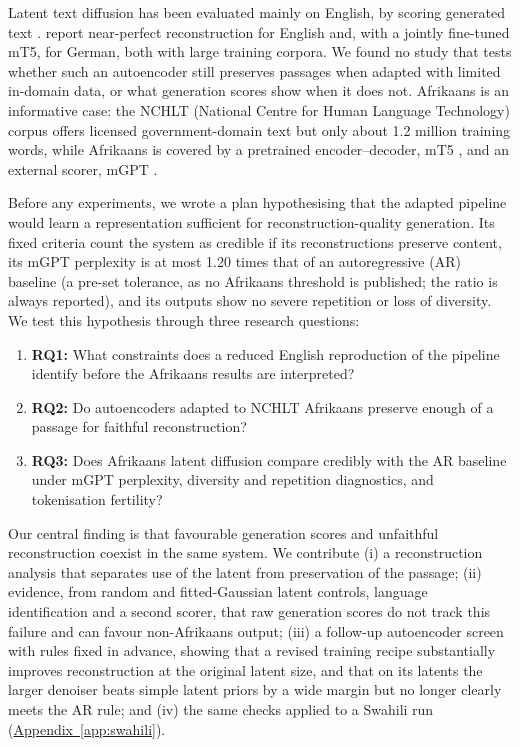 \documentclass[11pt,a4paper]{article}
\begin{document}
Latent text diffusion has been evaluated mainly on English, by scoring generated text \citep{li2022diffusionlm,gong2023diffuseq,lovelace2023latent}. \citet{lovelace2023latent} report near-perfect reconstruction for English and, with a jointly fine-tuned mT5, for German, both with large training corpora. We found no study that tests whether such an autoencoder still preserves passages when adapted with limited in-domain data, or what generation scores show when it does not. Afrikaans is an informative case: the NCHLT (National Centre for Human Language Technology) corpus offers licensed government-domain text \citep{eiselen2014developing} but only about 1.2 million training words, while Afrikaans is covered by a pretrained encoder--decoder, mT5 \citep{xue2021mt5}, and an external scorer, mGPT \citep{shliazhko2024mgpt}.

Before any experiments, we wrote a plan \citep{butt2026proposal} hypothesising that the adapted pipeline would learn a representation sufficient for reconstruction-quality generation. Its fixed criteria count the system as credible if its reconstructions preserve content, its mGPT perplexity is at most 1.20 times that of an autoregressive (AR) baseline (a pre-set tolerance, as no Afrikaans threshold is published; the ratio is always reported), and its outputs show no severe repetition or loss of diversity. We test this hypothesis through three research questions:
\begin{enumerate}
\item \textbf{RQ1:} What constraints does a reduced English reproduction of the pipeline identify before the Afrikaans results are interpreted?
\item \textbf{RQ2:} Do autoencoders adapted to NCHLT Afrikaans preserve enough of a passage for faithful reconstruction?
\item \textbf{RQ3:} Does Afrikaans latent diffusion compare credibly with the AR baseline under mGPT perplexity, diversity and repetition diagnostics, and tokenisation fertility?
\end{enumerate}

Our central finding is that favourable generation scores and unfaithful reconstruction coexist in the same system. We contribute (i) a reconstruction analysis that separates use of the latent from preservation of the passage; (ii) evidence, from random and fitted-Gaussian latent controls, language identification and a second scorer, that raw generation scores do not track this failure and can favour non-Afrikaans output; (iii) a follow-up autoencoder screen with rules fixed in advance, showing that a revised training recipe substantially improves reconstruction at the original latent size, and that on its latents the larger denoiser beats simple latent priors by a wide margin but no longer clearly meets the AR rule; and (iv) the same checks applied to a Swahili run (\hyperref[app:swahili]{Appendix~\ref*{app:swahili}}).
\end{document}
